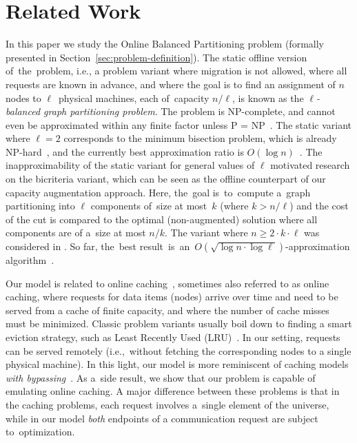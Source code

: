 \documentclass[manuscript,screen=true]{acmart}
\begin{document}
\section{Related Work}

In this paper we study the Online Balanced Partitioning problem (formally presented in Section~\ref{sec:problem-definition}).
The static offline version of~the~problem, i.e., a problem variant where
migration is not allowed, where all requests are known in advance, and where
the goal is to find an assignment of $n$ nodes to $\ell$~physical machines, each of~capacity $n/\ell$, is known as the
\emph{$\ell$-balanced graph partitioning problem}. The problem is 
NP-complete, and cannot even be approximated within any finite factor unless P
= NP~\cite{AndRae06}.  The static
variant where $\ell = 2$ corresponds to the minimum bisection problem, which
is already NP-hard~\cite{GaJoSt76}, and 
the currently best approximation ratio is $O(\log n)$~\cite{SarVaz95,ArKaKa99,FeKrNi00,FeiKra02,KraFei06,Raec08}.
The inapproximability of the static variant for general values of $\ell$
motivated research on the bicriteria variant, which can be seen as the offline
counterpart of our capacity augmentation approach. Here, the~goal
is~to~compute a~graph partitioning into $\ell$ components of~size at most~$k$ (where $k > n/\ell$) and the cost of the cut is compared to the optimal (non-augmented)
solution where all components are of a~size at most $n/k$. The variant where
$n \geq 2 \cdot k \cdot \ell$ was considered in
\cite{LeMaTr90,SimTen97,EvNaRS00,EvNaRS99,KrNaSc09}. So far, the~best result~is~an~$O(\!\sqrt{\log n \cdot \log \ell})$-approximation algorithm~\cite{KrNaSc09}.

Our model is related to online
caching~\cite{SleTar85,FKLMSY91,McGSle91,AcChNo00}, sometimes also referred to
as online caching, where requests for data items (nodes) arrive over time and
need to be served from a cache of finite capacity, and where the number of
cache misses must be minimized. Classic problem variants usually boil down to
finding a smart eviction strategy, such as Least Recently Used (LRU)~\cite{SleTar85}. In our
setting, requests can be served remotely (i.e.,~without fetching the
corresponding nodes to a single physical machine). In this light, our model is more
reminiscent of caching models \emph{with
bypassing}~\cite{EpImLN11,EpImLN15,Irani02}. As a~side result, we show that our problem is
capable of emulating online caching.
A major difference between  these problems is that in the caching problems, each request involves a~single element of the universe, while in our model \emph{both} endpoints of a communication request are subject to~optimization.
\end{document}
